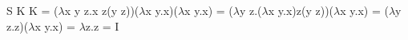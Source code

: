 \documentclass{article}
\begin{document}
   
    S K K = ($\lambda$x y z.x z(y z))($\lambda$x y.x)($\lambda$x y.x) = 
    ($\lambda$y z.($\lambda$x y.x)z(y z))($\lambda$x y.x) = 
    ($\lambda$y z.z)($\lambda$x y.x) = $\lambda$z.z = I
\end{document}
